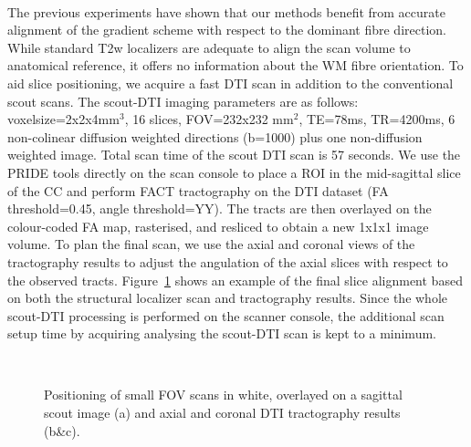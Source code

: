 \paragraph{}
The previous experiments have shown that our \SF{} methods benefit from accurate alignment of the gradient scheme with respect to the dominant fibre direction. While standard T2w localizers are adequate to align the scan volume to anatomical reference, it offers no information about the WM fibre orientation. To aid slice positioning, we acquire a fast DTI scan in addition to the conventional scout scans. The scout-DTI imaging parameters are as follows: voxelsize=2x2x4mm$^3$, 16 slices, FOV=232x232 mm$^2$, TE=78ms, TR=4200ms, 6 non-colinear diffusion weighted directions (b=1000) plus one non-diffusion weighted image. Total scan time of the scout DTI scan is 57 seconds. We use the PRIDE tools directly on the scan console to place a ROI in the mid-sagittal slice of the CC and perform FACT tractography on the DTI dataset (FA threshold=0.45, angle threshold=YY). The tracts are then overlayed on the colour-coded FA map, rasterised, and resliced to obtain a new 1x1x1 image volume. To plan the final \SF{} scan, we use the axial and coronal views of the tractography results to adjust the angulation of the axial slices with respect to the observed tracts.  Figure~\ref{fig:chap9 FOV positioning} shows an example of the final slice alignment based on both the structural localizer scan and tractography results. Since the whole scout-DTI processing is performed on the scanner console, the additional scan setup time by acquiring analysing the scout-DTI scan is kept to a minimum.

\begin{figure}[ht]
	\centering
	\begin{minipage}{0.35\textwidth}
	\\
	\end{minipage}\hspace{0.05\textwidth}
	\begin{minipage}{0.53\textwidth}
	\end{minipage}
	
	\caption{Positioning of small FOV scans in white, overlayed on a sagittal scout image (a) and axial and coronal DTI tractography results (b\&c).}
	\label{fig:chap9 FOV positioning}	
\end{figure}
